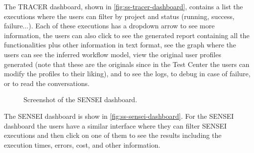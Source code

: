 The \ac{TRACER} dashboard,
shown in \autoref{fig:ss-tracer-dashboard},
contains a list the executions
where the users can filter by project and status (running, success, failure...).
Each of these executions has a dropdown arrow to see more information,
the users can also click to see the generated report
containing all the functionalities plus other information in text format,
see the graph where the users can see the inferred workflow model,
view the original user profiles generated
(note that these are the originals since in the Test Center
the users can modify the profiles to their liking),
and to see the logs, to debug in case of failure, or to read the conversations.

\begin{figure}[htpb]
  \centering
  \caption{Screenshot of the SENSEI dashboard.}
  \label{fig:ss-sensei-dashboard}
\end{figure}

The SENSEI dashboard is show in \autoref{fig:ss-sensei-dashboard}.
For the SENSEI dashboard the users have a similar interface
where they can filter SENSEI executions
and then click on one of them to see the results
including the execution times,
errors, cost, and other information.
